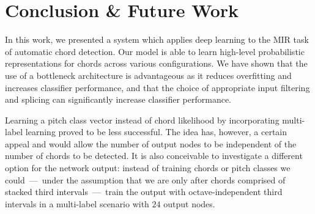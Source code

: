 \documentclass{article}
\begin{document}

\section{Conclusion \& Future Work}
In this work, we presented a system which applies deep learning to the MIR task of automatic chord detection. Our model is able to learn high-level probabilistic representations for chords across various configurations. We have shown that 
the use of a bottleneck architecture is advantageous as it reduces overfitting and increases classifier performance, and that
the choice of appropriate input filtering and splicing can significantly increase classifier performance.

Learning a pitch class vector instead of chord likelihood by incorporating multi-label learning proved to be less successful. The idea has, however, a certain appeal and would allow the number of output nodes to be independent of the number of chords to be detected. It is also conceivable to investigate a different option for the network output: instead of training chords or pitch classes we could~---~under the assumption that we are only after chords comprised of stacked third intervals~---~train the output with octave-independent third intervals in a multi-label scenario with $24$ output nodes.


\end{document}
